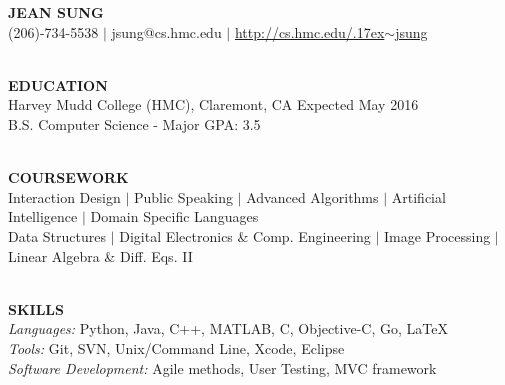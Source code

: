 \documentclass[11.5pt]{article}
\makeatletter
\newcommand{\selfName}{\textbf{\fontsize{30}{30}\selectfont JEAN SUNG }}
\newcommand{\email}{\large {jsung@cs.hmc.edu }}
\newcommand{\phone}{\large (206)-734-5538 }
\newcommand{\tildeText}{\raise.17ex\hbox{$\scriptstyle\sim$}}
\newcommand{\websitedisplaytext}{\large http://cs.hmc.edu/\tildeText jsung }
\newcommand{\website}{\href{http://cs.hmc.edu/~jsung}{\websitedisplaytext}}
\newcommand{\wrapTitle}[1]{{\sectionNL \textbf{\Large #1}} \sectionNL}
\newcommand{\vb}{ $\mid$ }
\newcommand{\sectionNL}{~\\[1pt]}
\newcommand{\HMC}{HMC}
\newcommand{\rightAlign}{\hfill}
\makeatother
\begin{document}
\begin{center}
\selfName\\
\phone  
\vb\email 
\vb\website \\
\hrulefill
\end{center}



\begin{flushleft}
\wrapTitle{EDUCATION}
Harvey Mudd College (\HMC), Claremont, CA \rightAlign Expected May 2016  \\
B.S. Computer Science - Major GPA: 3.5   \\
\end{flushleft}


\begin{flushleft}
\wrapTitle{COURSEWORK}
Interaction Design 
\vb Public Speaking
\vb Advanced Algorithms 
\vb Artificial Intelligence 
\vb Domain Specific Languages \\
Data Structures 
\vb Digital Electronics \& Comp. Engineering
\vb Image Processing  
\vb Linear Algebra \& Diff. Eqs. II



\end{flushleft}


\begin{flushleft}
\wrapTitle{SKILLS}
\textit{Languages:} Python, Java, C++, MATLAB, C, Objective-C, Go, \LaTeX \\
\textit{Tools:} Git, SVN, Unix/Command Line, Xcode, Eclipse \\ %
\textit{Software Development:} Agile methods, User Testing, MVC framework

\end{flushleft}
\end{document}
